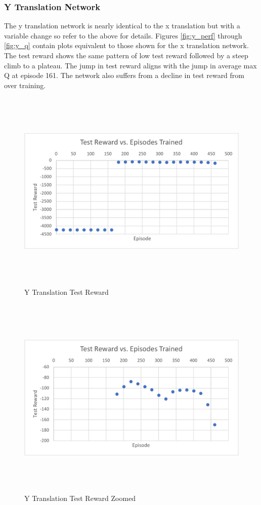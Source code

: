 \subsubsection{Y Translation Network}
The y translation network is nearly identical to the x translation but with a variable change so refer to the above for details. Figures \ref{fig:y_perf} through \ref{fig:y_q} contain plots equivalent to those shown for the x translation network. The test reward shows the same pattern of low test reward followed by a steep climb to a plateau. The jump in test reward aligns with the jump in average max Q at episode 161. The network also suffers from a decline in test reward from over training.
\begin{figure}[H]
	\centering
	\includegraphics[width=6in, height=3.85in, keepaspectratio]{figures/train_figs/y_r.pdf}
	\caption{Y Translation Test Reward} \label{fig:y_r}
\end{figure}
\begin{figure}[H]
	\centering
	\includegraphics[width=6in, height=3.85in, keepaspectratio]{figures/train_figs/y_rzoom.pdf}
	\caption{Y Translation Test Reward Zoomed} \label{fig:y_rzoom}
\end{figure}
